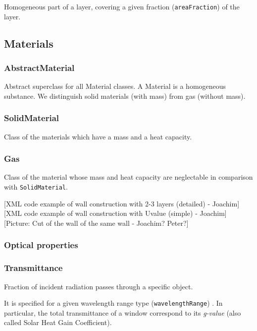 \documentclass[a4paper,12pt]{article}
\begin{document}
Homogeneous part of a layer, covering a given fraction
(\texttt{areaFraction}) of the layer.

\subsection{Materials}\label{materials}

\subsubsection{AbstractMaterial}\label{abstractmaterial}

Abstract superclass for all Material classes. A Material is a
homogeneous substance. We distinguish solid materials (with mass) from
gas (without mass).

\subsubsection{SolidMaterial}\label{solidmaterial}

Class of the materials which have a mass and a heat capacity.

\subsubsection{Gas}\label{gas}

Class of the material whose mass and heat capacity are neglectable in
comparison with \texttt{SolidMaterial}.

{[}XML code example of wall construction with 2-3 layers (detailed) -
Joachim{]}{[}XML code example of wall construction with Uvalue (simple)
- Joachim{]} {[}Picture: Cut of the wall of the same wall - Joachim?
Peter?{]}

\subsubsection{Optical properties}\label{optical-properties}

\subsubsection{Transmittance}\label{transmittance}

Fraction of incident radiation passes through a specific object.

It is specified for a given wavelength range type
(\texttt{wavelengthRange}) . In particular, the total transmittance of a
window correspond to its \emph{g-value} (also called Solar Heat Gain
Coefficient).
\end{document}
